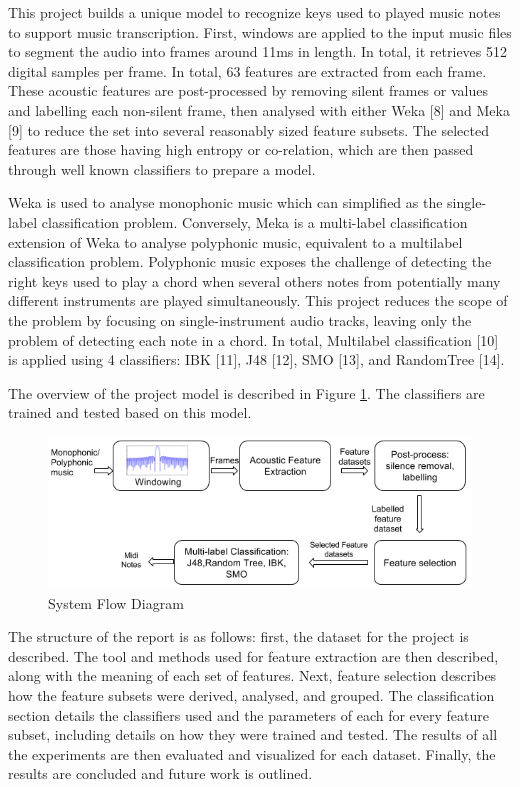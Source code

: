 \documentclass{article}
\begin{document}
This project builds a unique model to recognize keys used to played music notes to support music transcription. First, windows are applied to the input music files to segment the audio into frames around 11ms in length. In total, it retrieves 512 digital samples per frame. In total, 63 features are extracted from each frame. These acoustic features are post-processed by removing silent frames or values and labelling each non-silent frame, then analysed with either Weka [8] and Meka [9] to reduce the set into several reasonably sized feature subsets.  The selected features are those having high entropy or co-relation, which are then passed through well known classifiers to prepare a model. 

Weka is used to analyse monophonic music which can simplified as the single-label classification problem. Conversely, Meka is a multi-label classification extension of Weka to  analyse polyphonic music, equivalent to a multilabel classification problem. Polyphonic music exposes the challenge of detecting the right keys used to play a chord when several others notes from potentially many different instruments are played simultaneously. This project reduces the scope of the problem by focusing on single-instrument audio tracks, leaving only the problem of detecting each note in a chord. In total, Multilabel classification [10] is applied using 4 classifiers: IBK [11], J48 [12], SMO [13], and RandomTree [14]. 

The overview of the project model is described in Figure \ref{figure1}. The classifiers are trained and tested based on this model.

\begin{figure}[h]
\includegraphics[scale=.4]{overview}
 \caption{System Flow Diagram}
\label{figure1}
\end{figure}

The structure of the report is as follows: first, the dataset for the project is described. The tool and methods used for feature extraction are then described, along with the meaning of each set of features. Next, feature selection describes how the feature subsets were derived, analysed, and grouped. The classification section details the classifiers used and the parameters of each for every feature subset, including details on how they were trained and tested. The results of all the experiments are then evaluated and visualized for each dataset. Finally, the results are concluded and future work is outlined.
\end{document}
